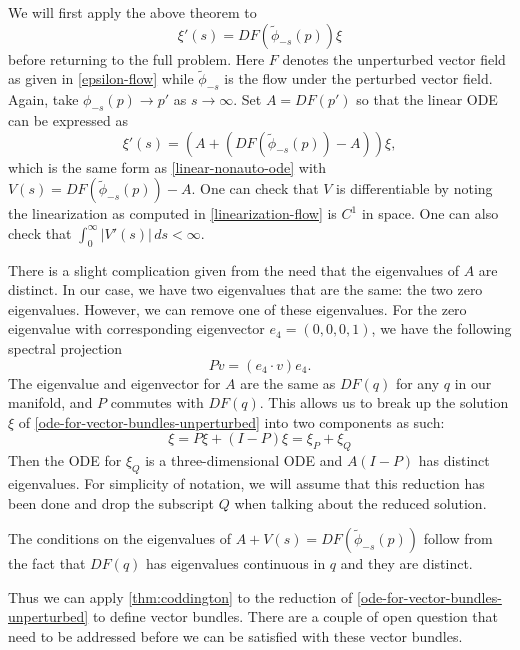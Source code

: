 We will first apply the above theorem to 
\begin{equation}\label{flow-for-tangent-vectors-unperturbed}
	\xi'(s) = DF(\tilde \phi_{-s}(p)) \xi
\end{equation}
before returning to the full problem. Here \(F\) denotes the unperturbed vector field as given in \cref{epsilon-flow} while \(\tilde\phi_{-s}\) is the flow under the perturbed vector field. Again, take \(\phi_{-s}(p) \to p'
\) as \(s\to \infty\). Set \(A = DF(p')\) so that the linear ODE can be expressed as
\begin{equation}\label{ode-for-vector-bundles-unperturbed}
	\xi'(s) = (A + (DF(\tilde \phi_{-s}(p)) - A)) \xi,
\end{equation}
which is the same form as \cref{linear-nonauto-ode} with \(V(s) = DF(\tilde \phi_{-s}(p)) - A\). One can check that \(V\) is differentiable by noting the linearization as computed in \cref{linearization-flow} is \(C^1\) in space. One can also check that \(\int_{0}^\infty |V'(s)|\, ds < \infty\).

There is a slight complication given from the need that the eigenvalues of \(A\) are distinct. In our case, we have two eigenvalues that are the same: the two zero eigenvalues. However, we can remove one of these eigenvalues. For the zero eigenvalue with corresponding eigenvector \(e_4 = (0, 0, 0, 1)\), we have the following spectral projection
\begin{equation*}
	P v = (e_4 \cdot v) e_4.
\end{equation*}
The eigenvalue and eigenvector for \(A\) are the same as \(DF(q)\) for any \(q\) in our manifold, and \(P\) commutes with \(DF(q)\). This allows us to break up the solution \(\xi\) of \cref{ode-for-vector-bundles-unperturbed} into two components as such:
\begin{equation*}
	\xi = P\xi + (I-P)\xi = \xi_P + \xi_Q
\end{equation*}
Then the ODE for \(\xi_Q\) is a three-dimensional ODE and \(A(I-P)\) has distinct eigenvalues. For simplicity of notation, we will assume that this reduction has been done and drop the subscript \(Q\) when talking about the reduced solution.

The conditions on the eigenvalues of \(A+V(s) = DF(\tilde\phi_{-s}(p))\) follow from the fact that \(DF(q)\) has eigenvalues continuous in \(q\) and they are distinct.

Thus we can apply \cref{thm:coddington} to the reduction of \cref{ode-for-vector-bundles-unperturbed} to define vector bundles. There are a couple of open question that need to be addressed before we can be satisfied with these vector bundles. 


